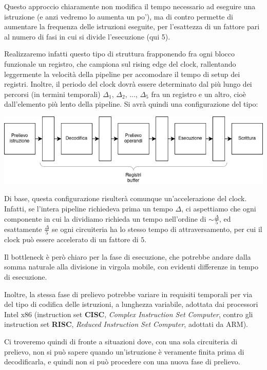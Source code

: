 \documentclass[a4paper,11pt]{article}
\begin{document}
Questo approccio chiaramente non modifica il tempo necessario ad eseguire una istruzione (e anzi vedremo lo aumenta un po'), ma di contro permette di aumentare la frequenza delle istruzioni eseguite, per l'esattezza di un fattore pari al numero di fasi in cui si divide l'esecuzione (qui 5).

Realizzaremo infatti questo tipo di struttura frapponendo fra ogni blocco funzionale un registro, che campiona sul rising edge del clock, rallentando leggermente la velocità della pipeline per accomodare il tempo di setup dei registri.
Inoltre, il periodo del clock dovrà essere determinato dal più lungo dei percorsi (in termini temporali) $\Delta_1$, $\Delta_2$, ..., $\Delta_5$ fra un registro e un altro, cioè dall'elemento più lento della pipeline.
Si avrà quindi una configurazione del tipo:
\begin{center}
	\includegraphics[scale=0.6]{../figures/pipeline.png}
\end{center}
Di base, questa configurazione risulterà comunque un'accelerazione del clock.
Infatti, se l'intera pipeline richiedeva prima un tempo $\Delta$, ci aspettiamo che ogni componente in cui la dividiamo richieda un tempo nell'ordine di $\sim \frac{\Delta}{5}$, ed esattamente $\frac{\Delta}{5}$ se ogni circuiteria ha lo stesso tempo di attraversamento, per cui il clock può essere accelerato di un fattore di $5$.

Il bottleneck è però chiaro per la fase di esecuzione, che potrebbe andare dalla somma naturale alla divisione in virgola mobile, con evidenti differenze in tempo di esecuzione.

Inoltre, la stessa fase di prelievo potrebbe variare in requisiti temporali per via del tipo di codifica delle istruzioni, a lunghezza variabile, adottata dai processori Intel x86 (instruction set \textbf{CISC}, \textit{Complex Instruction Set Computer}, contro gli instruction set \textbf{RISC}, \textit{Reduced Instruction Set Computer}, adottati da ARM).

Ci troveremo quindi di fronte a situazioni dove, con una sola circuiteria di prelievo, non si può sapere quando un'istruzione è veramente finita prima di decodificarla, e quindi non si può procedere con una nuova fase di prelievo.
\end{document}
